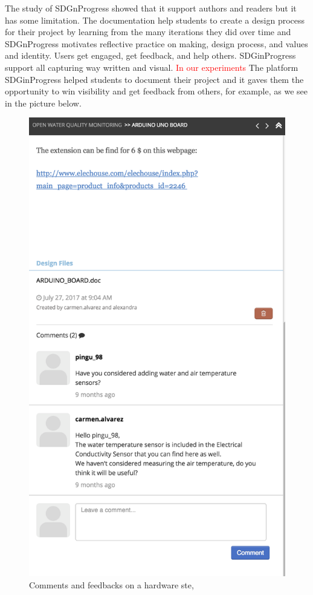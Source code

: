 The study of SDGnProgress showed that it support authors and readers but it has some limitation. The documentation help students to create a design process for their project by learning from the many iterations they did over time and SDGnProgress motivates reflective practice on making, design process, and values and identity. Users get engaged, get feedback, and help others. SDGinProgress support all capturing way written and visual. \textcolor{red}{In our experiments} The platform SDGinProgress helped students to document their project and it gaves them the opportunity to win visibility and get feedback from others, for example, as we see in the picture below. 
\begin{figure}[ht!]
	\centering
	\includegraphics[width=.3\textheight]{./images/img-cmtsdgip.png}
	\caption{Comments and feedbacks on a hardware ste, \cite[\url{https://sdginprogress.com/projects/47/steps?comment_id=4&notification_id=442&step=214}]{SDGdinP1}} 
	\label{img-cmtsdgip}
\end{figure}
